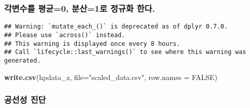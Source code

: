 \documentclass[
]{article}
\newenvironment{Shaded}{\begin{snugshade}}{\end{snugshade}}
\newcommand{\DataTypeTok}[1]{\textcolor[rgb]{0.13,0.29,0.53}{#1}}
\newcommand{\DecValTok}[1]{\textcolor[rgb]{0.00,0.00,0.81}{#1}}
\newcommand{\KeywordTok}[1]{\textcolor[rgb]{0.13,0.29,0.53}{\textbf{#1}}}
\newcommand{\NormalTok}[1]{#1}
\newcommand{\OperatorTok}[1]{\textcolor[rgb]{0.81,0.36,0.00}{\textbf{#1}}}
\newcommand{\OtherTok}[1]{\textcolor[rgb]{0.56,0.35,0.01}{#1}}
\newcommand{\StringTok}[1]{\textcolor[rgb]{0.31,0.60,0.02}{#1}}
\begin{document}
\hypertarget{uxac01uxbcc0uxc218uxb97c-uxd3c9uxade00-uxbd84uxc0b01uxb85c-uxc815uxaddcuxd654-uxd55cuxb2e4.}{%
\subsubsection{각변수를 평균=0, 분산=1로 정규화
한다.}\label{uxac01uxbcc0uxc218uxb97c-uxd3c9uxade00-uxbd84uxc0b01uxb85c-uxc815uxaddcuxd654-uxd55cuxb2e4.}}

\begin{Shaded}
\end{Shaded}

\begin{verbatim}
## Warning: `mutate_each_()` is deprecated as of dplyr 0.7.0.
## Please use `across()` instead.
## This warning is displayed once every 8 hours.
## Call `lifecycle::last_warnings()` to see where this warning was generated.
\end{verbatim}

\begin{Shaded}
\begin{Highlighting}[]
\KeywordTok{write.csv}\NormalTok{(hpdata_z, }\DataTypeTok{file=}\StringTok{"scaled_data.csv"}\NormalTok{, }\DataTypeTok{row.names =} \OtherTok{FALSE}\NormalTok{)}
\end{Highlighting}
\end{Shaded}

\hypertarget{uxacf5uxc120uxc131-uxc9c4uxb2e8}{%
\subsubsection{공선성 진단}\label{uxacf5uxc120uxc131-uxc9c4uxb2e8}}
\end{document}
